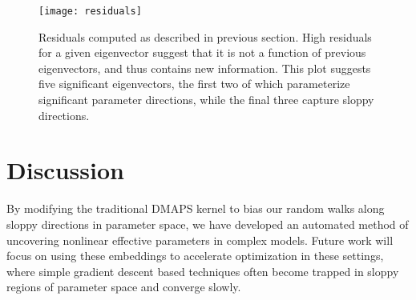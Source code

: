 \begin{figure}
  \centering
  \texttt{[image: residuals]}
  \caption[Plot of DMAPS residuals showing which eigenvectors are
  independent]{Residuals computed as described in previous
    section. High residuals for a given eigenvector suggest that it is
    not a function of previous eigenvectors, and thus contains new
    information. This plot suggests five significant eigenvectors, the
    first two of which parameterize significant parameter directions,
    while the final three capture sloppy
    directions. \label{fig:resids} }
\end{figure}


\section{Discussion}

By modifying the traditional DMAPS kernel to bias our random walks
along sloppy directions in parameter space, we have developed an
automated method of uncovering nonlinear effective parameters in
complex models. Future work will focus on using these embeddings to
accelerate optimization in these settings, where simple gradient
descent based techniques often become trapped in sloppy regions of
parameter space and converge slowly.
